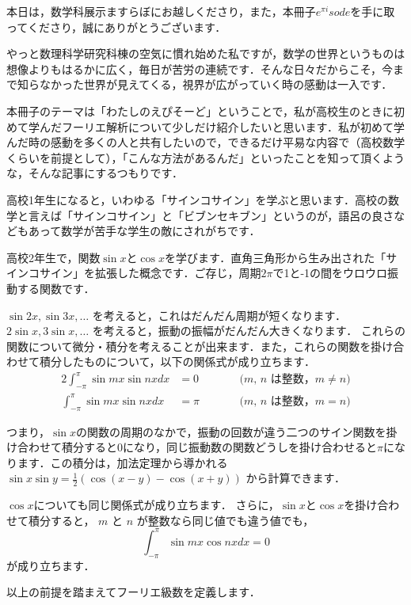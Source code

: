 本日は，数学科展示ますらぼにお越しくださり，また，本冊子$e^{\pi i}sode$を手に取ってくださり，誠にありがとうございます．

やっと数理科学研究科棟の空気に慣れ始めた私ですが，数学の世界というものは想像よりもはるかに広く，毎日が苦労の連続です．そんな日々だからこそ，今まで知らなかった世界が見えてくる，視界が広がっていく時の感動は一入です．

本冊子のテーマは「わたしのえぴそーど」ということで，私が高校生のときに初めて学んだフーリエ解析について少しだけ紹介したいと思います．私が初めて学んだ時の感動を多くの人と共有したいので，できるだけ平易な内容で（高校数学くらいを前提として），「こんな方法があるんだ」といったことを知って頂くような，そんな記事にするつもりです．

高校1年生になると，いわゆる「サインコサイン」を学ぶと思います．高校の数学と言えば「サインコサイン」と「ビブンセキブン」というのが，語呂の良さなどもあって数学が苦手な学生の敵にされがちです．

高校2年生で，関数$\sin x$と$\cos x$を学びます．直角三角形から生み出された「サインコサイン」を拡張した概念です．ご存じ，周期$2 \pi$で1と-1の間をウロウロ振動する関数です．

$\sin 2x,\sin 3x,\dotsc$ を考えると，これはだんだん周期が短くなります． $2\sin x,3\sin x,\dotsc$ を考えると，振動の振幅がだんだん大きくなります．
これらの関数について微分・積分を考えることが出来ます．また，これらの関数を掛け合わせて積分したものについて，以下の関係式が成り立ちます．
\begin{alignat*}{2}
  \int_{-\pi}^\pi \sin mx \sin nx dx &= 0
  & \qquad &
\text{($m$, $n$ は整数，$m \neq n$)} \\
\int_{-\pi}^\pi \sin mx \sin nx dx &= \pi
& &
\text{($m$, $n$ は整数，$m = n$)}
\end{alignat*}

つまり，$\sin x$の関数の周期のなかで，振動の回数が違う二つのサイン関数を掛け合わせて積分すると0になり，同じ振動数の関数どうしを掛け合わせると$\pi$になります．この積分は，加法定理から導かれる
$\sin x \sin y = \frac{1}{2} (\cos(x-y)-\cos(x+y))$
から計算できます．

$\cos x$についても同じ関係式が成り立ちます．
さらに，$\sin x$と$\cos x$を掛け合わせて積分すると， $m$ と $n$ が整数なら同じ値でも違う値でも，
\[
  \int_{-\pi}^\pi \sin mx \cos nx dx = 0
\]
が成り立ちます．

以上の前提を踏まえてフーリエ級数を定義します．

